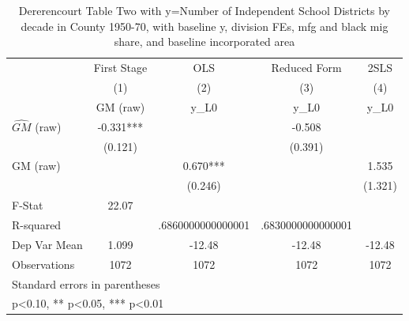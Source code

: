 \begin{table}[htbp]\centering
\def\sym#1{\ifmmode^{#1}\else\(^{#1}\)\fi}
\caption{Dererencourt Table Two with y=Number of Independent School Districts by decade in County 1950-70, with baseline y, division FEs, mfg and black mig share, and baseline incorporated area}
\begin{tabular}{l*{4}{c}}
\toprule
                    & First Stage   &         OLS   &Reduced Form   &        2SLS   \\
                    &\multicolumn{1}{c}{(1)}&\multicolumn{1}{c}{(2)}&\multicolumn{1}{c}{(3)}&\multicolumn{1}{c}{(4)}\\
                    &\multicolumn{1}{c}{GM  (raw)}&\multicolumn{1}{c}{y\_L0}&\multicolumn{1}{c}{y\_L0}&\multicolumn{1}{c}{y\_L0}\\
\midrule
$\hat{GM}$ (raw)    &      -0.331***&               &      -0.508   &               \\
                    &     (0.121)   &               &     (0.391)   &               \\
\addlinespace
GM  (raw)           &               &       0.670***&               &       1.535   \\
                    &               &     (0.246)   &               &     (1.321)   \\
\midrule
F-Stat              &       22.07   &               &               &               \\
R-squared           &               &.6860000000000001   &.6830000000000001   &               \\
Dep Var Mean        &       1.099   &      -12.48   &      -12.48   &      -12.48   \\
Observations        &        1072   &        1072   &        1072   &        1072   \\
\bottomrule
\multicolumn{5}{l}{\footnotesize Standard errors in parentheses}\\
\multicolumn{5}{l}{\footnotesize * p<0.10, ** p<0.05, *** p<0.01}\\
\end{tabular}
\end{table}
